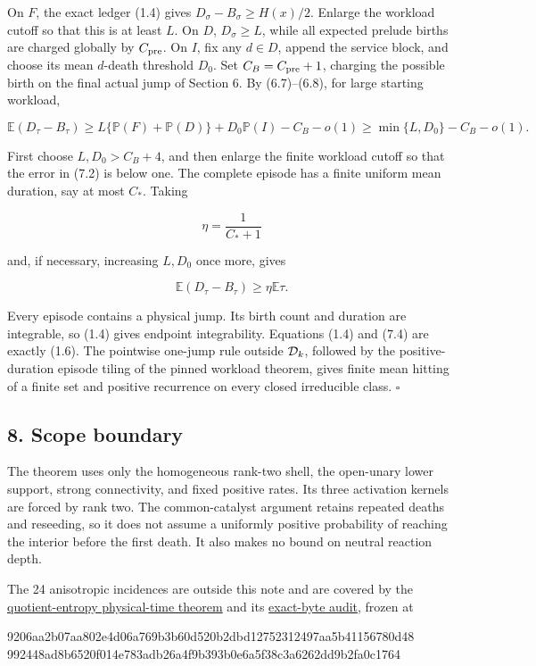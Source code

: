 On \(F\), the exact ledger (1.4) gives \(D_\sigma-B_\sigma\ge H(x)/2\).
Enlarge the workload cutoff so that this is at least \(L\). On \(D\),
\(D_\sigma\ge L\), while all expected prelude births are charged
globally by \(C_{\rm pre}\). On \(I\), fix any \(d\in D\), append the
service block, and choose its mean \(d\)-death threshold \(D_0\). Set
\(C_B=C_{\rm pre}+1\), charging the possible birth on the final actual
jump of Section 6. By (6.7)--(6.8), for large starting workload,

\[
 \mathbb E(D_\tau-B_\tau)
 \ge L\{\mathbb P(F)+\mathbb P(D)\}
        +D_0\mathbb P(I)-C_B-o(1)
 \ge\min\{L,D_0\}-C_B-o(1).                          \tag{7.2}
\]

First choose \(L,D_0>C_B+4\), and then enlarge the finite workload
cutoff so that the error in (7.2) is below one. The complete episode has
a finite uniform mean duration, say at most \(C_*\). Taking

\[
                              \eta=\frac1{C_*+1}      \tag{7.3}
\]

and, if necessary, increasing \(L,D_0\) once more, gives

\[
       \mathbb E(D_\tau-B_\tau)\ge\eta\mathbb E\tau. \tag{7.4}
\]

Every episode contains a physical jump. Its birth count and duration are
integrable, so (1.4) gives endpoint integrability. Equations (1.4) and
(7.4) are exactly (1.6). The pointwise one-jump rule outside
\({\cal D}_k\), followed by the positive-duration episode tiling of the
pinned workload theorem, gives finite mean hitting of a finite set and
positive recurrence on every closed irreducible class. \(\square\)

\subsection{8. Scope boundary}

The theorem uses only the homogeneous rank-two shell, the open-unary
lower support, strong connectivity, and fixed positive rates. Its three
activation kernels are forced by rank two. The common-catalyst argument
retains repeated deaths and reseeding, so it does not assume a uniformly
positive probability of reaching the interior before the first death. It
also makes no bound on neutral reaction depth.

The 24 anisotropic incidences are outside this note and are covered by
the
\href{proof_first_336_h112_quotient_foster_theorem.md}{quotient-entropy
physical-time theorem} and its
\href{proof_first_336_h112_quotient_foster_exact_byte_audit.md}{exact-byte
audit}, frozen at

\begin{CodeBlock}
9206aa2b07aa802e4d06a769b3b60d520b2dbd12752312497aa5b41156780d48
992448ad8b6520f014e783adb26a4f9b393b0e6a5f38c3a6262dd9b2fa0c1764
\end{CodeBlock}
